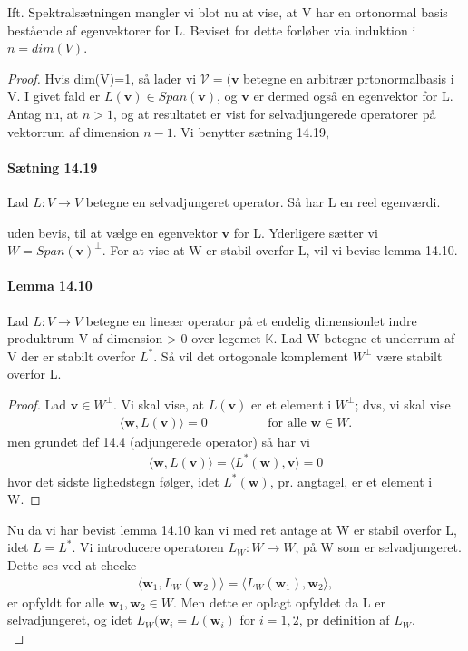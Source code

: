 \documentclass[paper=a4, fontsize=11pt]{scrartcl} %
\begin{document}
			Ift. Spektralsætningen mangler vi blot nu at vise, at V har en ortonormal basis bestående af egenvektorer for L.
			Beviset for dette forløber via induktion i $\textit{n}=dim(V)$.
			\begin{proof} Hvis dim(V)=1, så lader vi $\mathcal{V}=(\mathbf{v}$ betegne en arbitrær prtonormalbasis i V. I givet fald er $L(\mathbf{v})\in Span(\mathbf{v})$, og $\mathbf{v}$ er dermed også en egenvektor for L. \\
				Antag nu, at $n>1$, og at resultatet er vist for selvadjungerede operatorer på vektorrum af dimension $n-1$. Vi benytter sætning 14.19, 
				\begin{displayquote} 
					\item \paragraph{Sætning 14.19} Lad $L:V\rightarrow V$ betegne en selvadjungeret operator. Så har L en reel egenværdi.
				\end{displayquote}
				uden bevis, til at vælge en egenvektor $\mathbf{v}$ for L. Yderligere sætter vi $W=Span(\mathbf{v})^\bot$. For at vise at W er stabil overfor L, vil vi bevise lemma 14.10.
				\paragraph{Lemma 14.10} Lad $L:V\rightarrow V$ betegne en lineær operator på et endelig dimensionlet indre produktrum V af dimension > 0 over legemet $\mathbb{K}$. Lad W betegne et underrum af V der er stabilt overfor $L^*$. Så vil det ortogonale komplement $W^\bot$ være stabilt overfor L.
				\begin{proof}
					Lad $\mathbf{v}\in W^\bot$. Vi skal vise, at $L(\mathbf{v})$ er et element i $W^\bot$; dvs, vi skal vise
					\begin{align*}
					\langle\mathbf{w},L(\mathbf{v})\rangle=0 \hspace{2cm} \text{for alle } \mathbf{w}\in W.
					\end{align*}
					men grundet def 14.4 (adjungerede operator) så har vi 
					\begin{align*}
					\langle\mathbf{w},L(\mathbf{v})\rangle=\langle L^*(\mathbf{w}),\mathbf{v}\rangle=0
					\end{align*}
					hvor det sidste lighedstegn følger, idet $L^*(\mathbf{w})$, pr. angtagel, er et element i W.
				\end{proof}
				Nu da vi har bevist lemma 14.10 kan vi med ret antage at W er stabil overfor L, idet $L=L^*$. Vi introducere operatoren $L_W:W\rightarrow W$, på W som er selvadjungeret. Dette ses ved at checke
				\begin{align*}
				\langle\mathbf{w}_1,L_W(\mathbf{w}_2)\rangle=\langle L_W(\mathbf{w}_1),\mathbf{w}_2\rangle,
				\end{align*}
				er opfyldt for alle $\mathbf{w}_1,\mathbf{w}_2\in W$. Men dette er oplagt opfyldet da L er selvadjungeret, og idet $L_W(\mathbf{w}_i=L(\mathbf{w}_i)$ for $i=1,2$, pr definition af $L_W$.\\
				

\end{proof}
\end{document}
